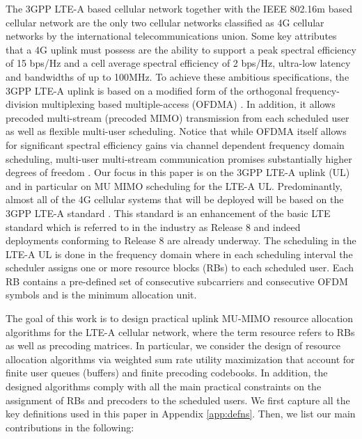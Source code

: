 \documentclass[11pt] {article}
\begin{document}
 The 3GPP LTE-A based cellular network \cite{3gpp} together with the IEEE 802.16m based cellular network are the only two cellular networks classified as 4G cellular networks by the international telecommunications union. Some key attributes that a 4G uplink must possess  are the ability to support a peak spectral efficiency of 15 bps/Hz  and a cell average spectral efficiency of 2 bps/Hz,   ultra-low latency and  bandwidths of up to 100MHz. To achieve these ambitious specifications, the 3GPP LTE-A uplink is based on a modified form of the
orthogonal frequency-division multiplexing based multiple-access (OFDMA)  \cite{3gpp}.
 In addition,  it allows precoded multi-stream (precoded MIMO) transmission from each scheduled user as well as  flexible multi-user   scheduling. Notice that while OFDMA itself allows for significant spectral efficiency gains via channel dependent frequency domain scheduling,   multi-user multi-stream communication promises substantially higher degrees of freedom \cite{YuW:degfree}.
Our focus in this paper is on the 3GPP LTE-A uplink (UL) and in particular on MU MIMO scheduling for the  LTE-A UL. Predominantly, almost all of the 4G cellular systems that will be deployed will be based on the 3GPP LTE-A standard \cite{3gpp}.  This standard is an  enhancement of the basic LTE standard which is referred to in the industry as Release 8  and indeed deployments conforming to Release 8 are already underway. The scheduling  in the LTE-A UL is done in the frequency domain where in each scheduling interval the scheduler assigns one or more resource blocks (RBs)   to  each scheduled user. Each RB contains a pre-defined set of consecutive subcarriers and consecutive OFDM symbols and is the minimum allocation unit.




The goal of this work is to design practical uplink MU-MIMO resource
allocation algorithms for the  LTE-A cellular network, where the term resource
refers to RBs as well as precoding matrices. In particular, we consider the design of resource allocation algorithms via weighted sum rate utility maximization that account for   finite user queues (buffers) and finite precoding codebooks. In addition, the designed algorithms comply with all the main practical constraints on the assignment of RBs  and precoders to the scheduled users. We first capture all the key definitions used in this paper in Appendix \ref{app:defns}. Then, we list
our main contributions  in the following:
\end{document}

